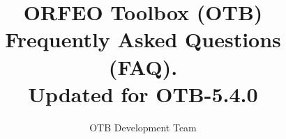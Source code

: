 \documentclass[english]{article}
\begin{document}
\title{ORFEO Toolbox (OTB) Frequently Asked Questions (FAQ).\\ Updated
  for OTB-5.4.0}


\author{OTB Development Team}


\maketitle

\tableofcontents



%

%
\end{document}
